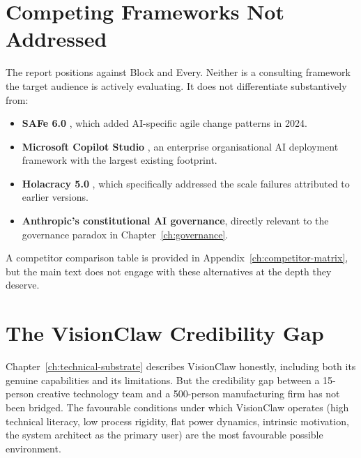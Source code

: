 \section{Competing Frameworks Not Addressed}

The report positions against Block and Every. Neither is a consulting framework the target audience is actively evaluating. It does not differentiate substantively from:

\begin{itemize}
  \item \textbf{SAFe 6.0} \parencite{SAFe2024}, which added AI-specific agile change patterns in 2024.
  \item \textbf{Microsoft Copilot Studio} \parencite{MicrosoftCopilotStudio2025}, an enterprise organisational AI deployment framework with the largest existing footprint.
  \item \textbf{Holacracy 5.0} \parencite{Holacracy2024}, which specifically addressed the scale failures attributed to earlier versions.
  \item \textbf{Anthropic's constitutional AI governance}, directly relevant to the governance paradox in Chapter~\ref{ch:governance}.
\end{itemize}

A competitor comparison table is provided in Appendix~\ref{ch:competitor-matrix}, but the main text does not engage with these alternatives at the depth they deserve.

\section{The VisionClaw Credibility Gap}

Chapter~\ref{ch:technical-substrate} describes VisionClaw honestly, including both its genuine capabilities and its limitations. But the credibility gap between a 15-person creative technology team and a 500-person manufacturing firm has not been bridged. The favourable conditions under which VisionClaw operates (high technical literacy, low process rigidity, flat power dynamics, intrinsic motivation, the system architect as the primary user) are the most favourable possible environment.

